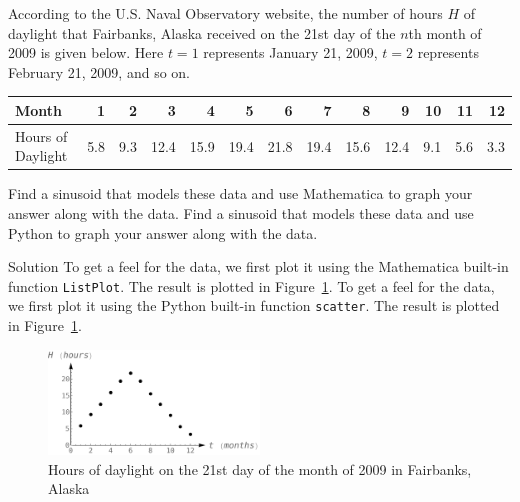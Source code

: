 \begin{example}
 According to the U.S. Naval Observatory website, the number of hours $H$ of daylight that Fairbanks, Alaska received on the 21st day of the $n$th month of 2009 is given below.  Here  $t = 1$ represents January 21, 2009, $t = 2$ represents February 21, 2009, and so on.  

\begin{center}
\noindent \begin{tabular}{p{1.5cm}|rrrrrrrrrrrr} \hline\hline
Month & 1 & 2 & 3 & 4 & 5 & 6 & 7 & 8 & 9 & 10 & 11 & 12\\ 
\hline 
Hours of Daylight & 5.8 & 9.3 & 12.4 & 15.9 & 19.4 & 21.8 & 19.4 & 15.6 & 12.4 & 9.1 & 5.6 & 3.3 \\ \hline\hline
\end{tabular}
\end{center}


\ifmathematica
Find a sinusoid that models these data and use Mathematica to graph your answer along with the data. 
\fi
\ifpython
Find a sinusoid that models these data and use Python to graph your answer along with the data. 
\fi

Solution 
\ifmathematica
 To get a feel for the data, we first plot it using the Mathematica built-in function \lstinline{ListPlot}.
 The result is plotted in Figure~\ref{fig_trans_27}.
 \fi
 \ifpython
  To get a feel for the data, we first plot it using the Python built-in function \lstinline{scatter}.
 The result is plotted in Figure~\ref{fig_trans_27}.\fi

\begin{figure}[H]
	\begin{center}
			\includegraphics[width=0.5\textwidth]{fig_trans_27}
	\caption{Hours of daylight on the 21st day of the month of 2009 in Fairbanks, Alaska}
	\label{fig_trans_27}
	\end{center}
\end{figure}





\end{example}
